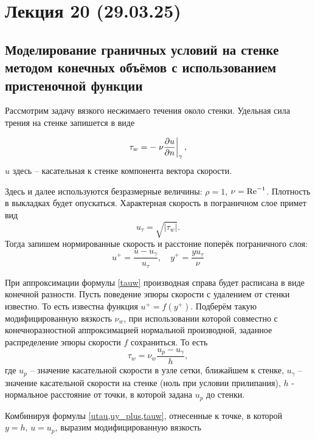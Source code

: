 \section{Лекция 20 (29.03.25)}

\subsection{Моделирование граничных условий на стенке методом конечных объёмов с использованием пристеночной функции}

Рассмотрим задачу вязкого несжимаего течения около стенки.
Удельная сила трения на стенке запишется в виде

\begin{equation}
\label{tauw}
\tau_w = -\left.\nu\frac{\partial u}{\partial n}\right|_{\gamma},
\end{equation}
$u$ здесь -- касательная к стенке компонента вектора скорости.

Здесь и далее используются безразмерные величины: $\rho=1$, $\nu = \mathrm{Re}^{-1}$.
Плотность в выкладках будет опускаться.
Характерная скорость в пограничном слое примет вид
\begin{equation}
\label{utau}
u_\tau = \sqrt{\left|\tau_w\right|}.
\end{equation}
Тогда запишем нормированные скорость и расстоние поперёк пограничного слоя:
\begin{equation}
\label{uy_plus}
u^{+} = \frac{u - u_\gamma}{u_\tau}, \quad y^{+} = \frac{y u_\tau}{\nu}
\end{equation}

При аппроксимации формулы \cref{tauw} производная справа будет расписана в виде конечной разности.
Пусть поведение эпюры скорости с удалением от стенки известно.
То есть известна функция $u^{+} = f(y^{+})$.
Подберём такую модифицированную вязкость $\nu_w$,
при использовании которой совместно с конечноразностной аппроксимацией
нормальной производной, заданное распределение эпюры скорости $f$ сохраниться.
То есть
\begin{equation}
\label{tauw}
\tau_w = \nu_w  \frac{u_p - u_\gamma}{h},
\end{equation}
где $u_p$ -- значение касательной скорости в узле сетки, ближайшем к стенке,
$u_\gamma$ -- значение касательной скорости  на стенке (ноль при условии прилипания),
$h$ - нормальное расстояние от точки, в которой задана $u_p$ до стенки.

Комбинируя формулы \cref{utau,uy_plus,tauw}, отнесенные к точке, в которой $y=h, \, u=u_p$, выразим модифицированную вязкость

